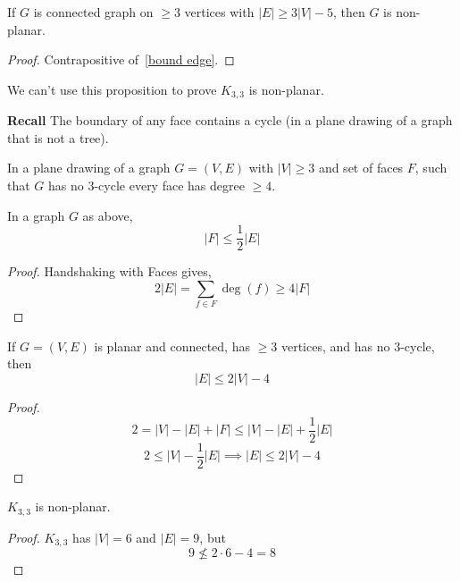 \begin{thmbox}
    \begin{prop}
        If $ G $ is connected graph on $ \geqslant 3 $ vertices
        with $ |E|\geqslant 3|V|-5 $, then $ G $ is non-planar.
    \end{prop}
\end{thmbox}
\begin{proof}
    Contrapositive of~\ref{bound edge}.
\end{proof}
We can't use this proposition to prove $ K_{3,3} $ is non-planar.

\textbf{Recall} The boundary of any face contains a cycle (in a plane drawing
of a graph that is not a tree).

\begin{thmbox}
    \begin{corollary}
        In a plane drawing of a graph $ G=(V,E) $ with
        $ |V|\geqslant 3 $ and set of faces $ F $, such that
        $ G $ has no $3$-cycle every face
        has degree $ \geqslant 4 $.
    \end{corollary}
\end{thmbox}

\begin{thmbox}
    \begin{corollary}
        In a graph $ G $ as above,
        \[ |F|\leqslant \frac{1}{2} |E| \]
    \end{corollary}
\end{thmbox}
\begin{proof}
    Handshaking with Faces gives,
    \[ 2|E|=\sum\limits_{f\in F}\deg(f)\geqslant 4|F| \]
\end{proof}

\begin{thmbox}
    \begin{corollary}
        If $ G=(V,E) $ is planar and connected,
        has $ \geqslant 3 $ vertices, and has no
        $ 3 $-cycle, then
        \[ |E|\leqslant 2|V|-4 \]
    \end{corollary}
\end{thmbox}
\begin{proof}
    \[ 2=|V|-|E|+|F|\leqslant |V|-|E|+\frac{1}{2} |E| \]
    \[ 2\leqslant |V|-\frac{1}{2} |E|\implies |E|\leqslant 2|V|-4 \]
\end{proof}

\begin{thmbox}
    \begin{corollary}
        $ K_{3,3} $ is non-planar.
    \end{corollary}
\end{thmbox}
\begin{proof}
    $ K_{3,3} $ has $ |V|=6 $ and $ |E|=9 $, but
    \[ 9\nleqslant 2\cdot 6-4=8 \]
\end{proof}

